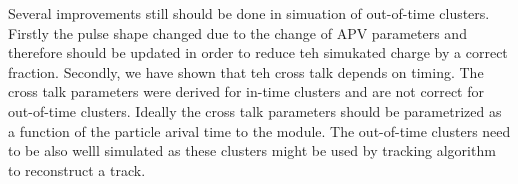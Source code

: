 Several improvements still should be done in simuation of out-of-time clusters. Firstly the pulse shape changed due to the change of APV parameters and therefore should be updated in order to reduce teh simukated charge by a correct fraction. Secondly, we have shown that teh cross talk depends on timing. The cross talk parameters were derived for in-time clusters and are not correct for out-of-time clusters. Ideally the cross talk parameters should be parametrized as a function of the particle arival time to the module. The out-of-time clusters need to be also welll simulated as these clusters might be used by tracking algorithm to reconstruct a track.


 





